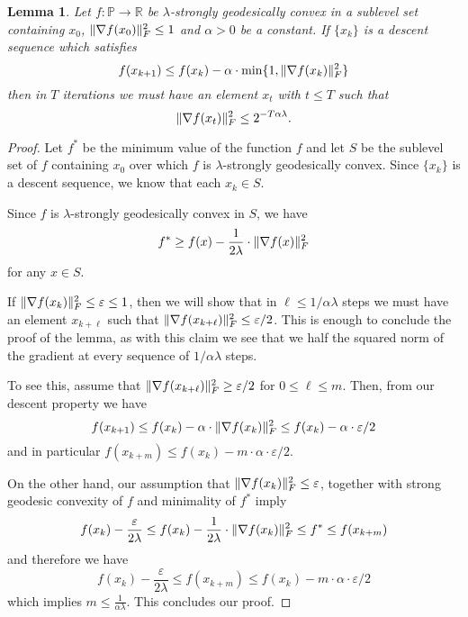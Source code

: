 \documentclass[aos]{imsart}
\newtheorem{lemma}[theorem]{Lemma}
\theoremstyle{definition}
\numberwithin{equation}{section}
\DeclarePairedDelimiter{\norm}{\lVert}{\rVert}
\newcommand{\R}{{\mathbb{R}}}
\newcommand{\SPD}{\mathbb{P}}
\begin{document}
\begin{lemma}\label{lem:descent-sublevel-set}
	Let $f : \SPD \rightarrow \R$ be $\lambda$-strongly geodesically convex in a sublevel set containing $x_0$, $\norm{\nabla f(x_0)}_F^2 \leq 1$ and $\alpha > 0$ be a constant.
	If $\{x_k\}$ is a descent sequence which satisfies
	$$ f(x_{k+1}) \leq f(x_k) - \alpha \cdot \min\{1,  \norm{\nabla f(x_k)}^2_F \} $$
	then in $T$ iterations we must have an element $x_t$ with $t\leq T$ such that
	$$ \norm{\nabla f(x_t)}^2_F \leq 2^{-T \alpha \lambda}.   $$
\end{lemma}

\begin{proof}
	Let $f^*$ be the minimum value of the function $f$ and let $S$ be the sublevel set of $f$ containing $x_0$ over which $f$ is $\lambda$-strongly geodesically convex. Since $\{x_k\}$ is a descent sequence, we know that each $x_k \in S$.

	Since $f$ is $\lambda$-strongly geodesically convex in $S$, we have
	$$ f^* \geq f(x) - \frac{1}{2\lambda} \cdot \norm{\nabla f(x)}_F^2 $$
	for any $x \in S$.

	If $\norm{\nabla f(x_k)}_F^2 \leq \varepsilon \leq 1$, then we will show that in $\ell \leq 1/\alpha \lambda$ steps we must have an element $x_{k+\ell}$ such that $\norm{\nabla f(x_{k + \ell})}_F^2 \leq \varepsilon/2$. This is enough to conclude the proof of the lemma, as with this claim we see that we half the squared norm of the gradient at every sequence of $1/\alpha \lambda$ steps.

	To see this, assume that $\norm{\nabla f(x_{k+\ell})}_F^2 \geq \varepsilon/2$ for $0 \leq \ell \leq m$. Then, from our descent property we have
	$$ f(x_{k+1}) \leq f(x_k) - \alpha \cdot \norm{\nabla f(x_k)}^2_F \leq f(x_k) - \alpha \cdot \varepsilon/2$$
	and in particular $f(x_{k + m}) \leq f(x_k) - m \cdot \alpha \cdot \varepsilon/2$.

	On the other hand, our assumption that $\norm{\nabla f(x_k)}_F^2 \leq \varepsilon$, together with strong geodesic convexity of $f$ and minimality of $f^*$ imply
	$$ f(x_{k}) - \frac{\varepsilon}{2\lambda} \leq f(x_{k}) - \frac{1}{2\lambda} \cdot \norm{\nabla f(x_k)}_F^2 \leq f^* \leq f(x_{k+m}) $$
	and therefore we have
	$$ f(x_{k}) - \frac{\varepsilon}{2\lambda} \leq f(x_{k + m}) \leq f(x_k) - m \cdot \alpha \cdot \varepsilon/2 $$
	which implies $m \leq \frac{1}{\alpha \lambda}$. This concludes our proof.
\end{proof}

\end{document}
